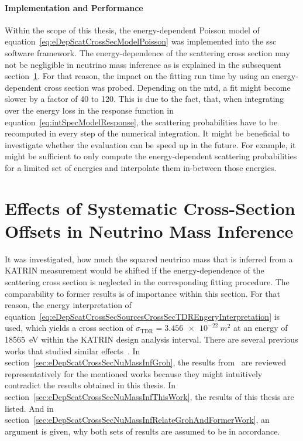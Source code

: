 \paragraph{Implementation and Performance}
Within the scope of this thesis, the energy-dependent Poisson model of equation~\eqref{eq:eDepScatCrossSecModelPoisson} was implemented into the \gls{ssc} software framework. The energy-dependence of the scattering cross section may not be negligible in neutrino mass inference as is explained in the subsequent section~\ref{sec:eDepScatCrossSecNuMassInf}. For that reason, the impact on the fitting run time by using an energy-dependent cross section was probed. Depending on the \gls{mtd}, a fit might become slower by a factor of 40 to 120. This is due to the fact, that, when integrating over the energy loss in the response function in equation~\eqref{eq:intSpecModelResponse}, the scattering probabilities have to be recomputed in every step of the numerical integration. It might be beneficial to investigate whether the evaluation can be speed up in the future. For example, it might be sufficient to only compute the energy-dependent scattering probabilities for a limited set of energies and interpolate them in-between those energies.

\section{Effects of Systematic Cross-Section Offsets in Neutrino Mass Inference}
\label{sec:eDepScatCrossSecNuMassInf}
It was investigated, how much the squared neutrino mass that is inferred from a KATRIN measurement would be shifted if the energy-dependence of the scattering cross section is neglected in the corresponding fitting procedure. The comparability to former results is of importance within this section. For that reason, the energy interpretation of equation~\eqref{eq:eDepScatCrossSecSourcesCrossSecTDREngeryInterpretation} is used, which yields a cross section of $\sigma_\mathrm{TDR}=\SI{3.456e-22}{m^2}$ at an energy of \SI{18565}{eV} within the KATRIN design analysis interval. There are several previous works that studied similar effects~\cite{Antoni2015,Groh2015,SeitzM2019,Kuckert2016,Kuckert2018}. In section~\ref{sec:eDepScatCrossSecNuMassInfGroh}, the results from~\cite{Groh2015} are reviewed representatively for the mentioned works because they might intuitively contradict the results obtained in this thesis. In section~\ref{sec:eDepScatCrossSecNuMassInfThisWork}, the results of this thesis are listed. And in section~\ref{sec:eDepScatCrossSecNuMassInfRelateGrohAndFormerWork}, an argument is given, why both sets of results are assumed to be in accordance.

